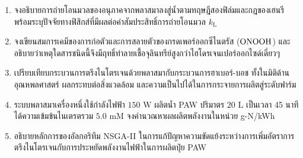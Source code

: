 \begin{enumerate}
    \item จงอธิบายการถ่ายโอนมวลของอนุภาคจากพลาสมาลงสู่น้ำตามทฤษฎีสองฟิล์มและกฎของเฮนรี พร้อมระบุปัจจัยทางฟิสิกส์ที่มีผลต่อค่าสัมประสิทธิ์การถ่ายโอนมวล $k_{\text{L}}$
    \item จงเขียนสมการเคมีของการก่อตัวและการสลายตัวของกรดเพอร์ออกซีไนตรัส ($\ce{ONOOH}$) และอธิบายว่าเหตุใดสารชนิดนี้จึงมีฤทธิ์ทำลายเชื้อจุลินทรีย์สูงกว่าไฮโดรเจนเปอร์ออกไซด์เดี่ยวๆ
    \item เปรียบเทียบกระบวนการตรึงไนโตรเจนด้วยพลาสมากับกระบวนการฮาเบอร์-บอช ทั้งในมิติด้านอุณหพลศาสตร์ ผลกระทบต่อสิ่งแวดล้อม และความเป็นไปได้ในการกระจายการผลิตสู่ระดับฟาร์ม
    \item ระบบพลาสมาเครื่องหนึ่งใช้กำลังไฟฟ้า $150 \text{ W}$ ผลิตน้ำ PAW ปริมาตร $20 \text{ L}$ เป็นเวลา 45 นาที ได้ความเข้มข้นไนเตรตรวม $5.0 \text{ mM}$ จงคำนวณหาผลผลิตพลังงานในหน่วย g-N/kWh
    \item อธิบายหลักการของอัลกอริทึม NSGA-II ในการแก้ปัญหาความขัดแย้งระหว่างการเพิ่มอัตราการตรึงไนโตรเจนกับการประหยัดพลังงานไฟฟ้าในการผลิตปุ๋ย PAW
\end{enumerate}
